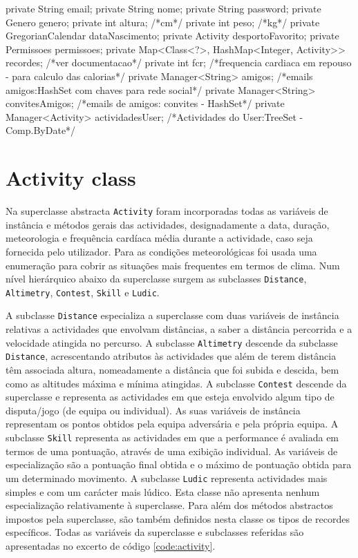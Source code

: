 \documentclass[a4paper,10pt]{report}
\begin{document}
\begin{code}[caption=Variáveis de instância da classe User (src/model/user)., label=code:user]
private String email;
private String nome;
private String password;
private Genero genero;
private int altura; /*cm*/
private int peso; /*kg*/
private GregorianCalendar dataNascimento;
private Activity desportoFavorito;
private Permissoes permissoes;
private Map<Class<?>, HashMap<Integer, Activity>>  recordes; /*ver documentacao*/
private int fcr; /*frequencia cardiaca em repouso - para calculo das calorias*/
private Manager<String> amigos; /*emails amigos:HashSet com chaves para rede social*/
private Manager<String> convitesAmigos; /*emails de amigos: convites - HashSet*/
private Manager<Activity> actividadesUser; /*Actividades do User:TreeSet -Comp.ByDate*/
\end{code}

\section{Activity class}
\label{sec:activity}
Na superclasse abstracta \verb!Activity! foram incorporadas todas as variáveis de instância e métodos gerais das actividades, 
designadamente a data, duração, meteorologia e frequência cardíaca média durante a actividade, caso seja fornecida pelo utilizador.
Para as condições meteorológicas foi usada uma enumeração para cobrir as situações mais frequentes em termos de clima.
Num nível hierárquico abaixo da superclasse surgem as subclasses \verb!Distance!, \verb!Altimetry!, \verb!Contest!, \verb!Skill! e \verb!Ludic!.

A subclasse \verb!Distance! especializa a superclasse com duas variáveis de instância relativas a actividades que envolvam distâncias, a saber a 
distância percorrida e a velocidade atingida no percurso.
A subclasse \verb!Altimetry! descende da subclasse \verb!Distance!, acrescentando atributos às actividades que além de terem distância têm associada altura, 
nomeadamente a distância que foi subida e descida, bem como as altitudes máxima e mínima atingidas.
A subclasse \verb!Contest! descende da superclasse e representa as actividades em que esteja envolvido algum tipo de disputa/jogo (de equipa ou individual).
As suas variáveis de instância representam os pontos obtidos pela equipa adversária e pela própria equipa.
A subclasse \verb!Skill! representa as actividades em que a performance é avaliada em termos de uma pontuação, através de uma exibição individual.
As variáveis de especialização são a pontuação final obtida e o máximo de pontuação obtida para um determinado movimento.
A subclasse \verb!Ludic! representa actividades mais simples e com um carácter mais lúdico. Esta classe não apresenta nenhum especialização relativamente à 
superclasse. Para além dos métodos abstractos impostos pela superclasse, são também definidos nesta classe os tipos de recordes específicos.
Todas as variáveis da superclasse e subclasses referidas são apresentadas no excerto de código \ref{code:activity}.
\end{document}
